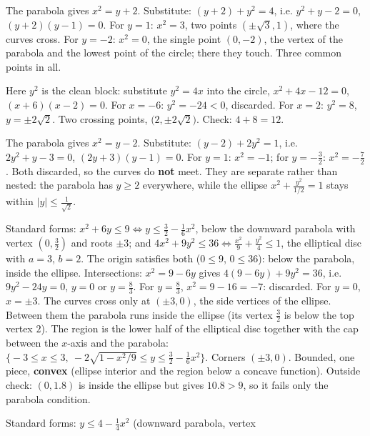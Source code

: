 \begin{solutions}
  \item The parabola gives $x^{2}=y+2$. Substitute:
        $(y+2)+y^{2}=4$, i.e. $y^{2}+y-2=0$, $(y+2)(y-1)=0$. For $y=1$:
        $x^{2}=3$, two points $(\pm\sqrt3,1)$, where the curves cross. For
        $y=-2$: $x^{2}=0$, the single point $(0,-2)$, the vertex of the
        parabola and the lowest point of the circle; there they touch.
        Three common points in all.
  \item Here $y^{2}$ is the clean block: substitute $y^{2}=4x$ into the
        circle, $x^{2}+4x-12=0$, $(x+6)(x-2)=0$. For $x=-6$:
        $y^{2}=-24<0$, discarded. For $x=2$: $y^{2}=8$, $y=\pm2\sqrt2$.
        Two crossing points, $\bigl(2,\pm2\sqrt2\bigr)$. Check:
        $4+8=12$. \checkmark
  \item The parabola gives $x^{2}=y-2$. Substitute:
        $(y-2)+2y^{2}=1$, i.e. $2y^{2}+y-3=0$, $(2y+3)(y-1)=0$. For $y=1$:
        $x^{2}=-1$; for $y=-\tfrac32$: $x^{2}=-\tfrac72$. Both discarded, so
        the curves do \textbf{not} meet. They are separate rather than
        nested: the parabola has $y\ge2$ everywhere, while the ellipse
        $x^{2}+\tfrac{y^{2}}{1/2}=1$ stays within
        $|y|\le\tfrac{1}{\sqrt2}$.
  \item Standard forms: $x^{2}+6y\le9\iff y\le\tfrac32-\tfrac16x^{2}$,
        below the downward parabola with vertex $(0,\tfrac32)$ and roots
        $\pm3$; and $4x^{2}+9y^{2}\le36\iff\tfrac{x^{2}}{9}+\tfrac{y^{2}}{4}
        \le1$, the elliptical disc with $a=3$, $b=2$. The origin satisfies
        both ($0\le9$, $0\le36$): below the parabola, inside the ellipse.
        Intersections: $x^{2}=9-6y$ gives $4(9-6y)+9y^{2}=36$, i.e.
        $9y^{2}-24y=0$, $y=0$ or $y=\tfrac83$. For $y=\tfrac83$,
        $x^{2}=9-16=-7$: discarded. For $y=0$, $x=\pm3$. The curves cross
        only at $(\pm3,0)$, the side vertices of the ellipse. Between them
        the parabola runs inside the ellipse (its vertex $\tfrac32$ is
        below the top vertex $2$). The region is the lower half of the
        elliptical disc together with the cap between the $x$-axis and the
        parabola:
        $\bigl\{-3\le x\le3,\ -2\sqrt{1-x^{2}/9}\le y\le\tfrac32-\tfrac16
        x^{2}\bigr\}$. Corners $(\pm3,0)$. Bounded, one piece,
        \textbf{convex} (ellipse interior and the region below a concave
        function). Outside check: $(0,1.8)$ is inside the ellipse but gives
        $10.8>9$, so it fails only the parabola condition.
  \item Standard forms: $y\le4-\tfrac14x^{2}$ (downward parabola, vertex

\end{solutions}
